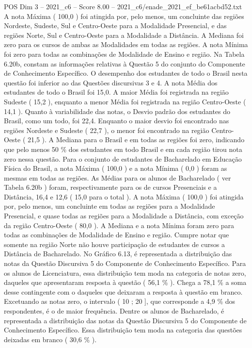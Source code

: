 \begin{textsample}{POS Dim 3 – 2021\_c6 – Score 8.00 – 2021\_c6/enade\_2021\_ef\_be61acbd52.txt}
A nota Máxima ( 100,0 ) foi atingida por, pelo menos, um concluinte das regiões Nordeste, Sudeste, Sul e Centro-Oeste para a Modalidade Presencial, e das regiões Norte, Sul e Centro-Oeste para a Modalidade a Distância.
A Mediana foi zero para os cursos de ambas as Modalidades em todas as regiões.
A nota Mínima foi zero para todas as combinações de Modalidade de Ensino e região.
Na Tabela 6.20b, constam as informações relativas à Questão 5 do conjunto do Componente de Conhecimento Específico.
O desempenho dos estudantes de todo o Brasil nesta questão foi inferior ao das Questões discursivas 3 e 4.
A nota Média dos estudantes de todo o Brasil foi 15,0.
A maior Média foi registrada na região Sudeste ( 15,2 ), enquanto a menor Média foi registrada na região Centro-Oeste ( 14,1 ).
Quanto à variabilidade das notas, o Desvio padrão dos estudantes do Brasil, como um todo, foi 22,4.
Enquanto o maior desvio foi encontrado nas regiões Nordeste e Sudeste ( 22,7 ), o menor foi encontrado na região Centro-Oeste ( 21,5 ).
A Mediana para o Brasil e em todas as regiões foi zero, indicando que pelo menos 50 \% dos estudantes em todo Brasil e em cada região tirou nota zero nessa questão.
Para o conjunto de estudantes de Bacharelado em Educação Física do Brasil, a nota Máxima ( 100,0 ) e a nota Mínima ( 0,0 ) foram as mesmas em todas as regiões.
As Médias para os alunos de Bacharelado ( ver Tabela 6.20b ) foram, respectivamente para os de cursos Presenciais e a Distância, 16,4 e 12,6 ( 15,0 para o total ).
A nota Máxima ( 100,0 ) foi atingida por, pelo menos, um concluinte em todas as regiões para a Modalidade Presencial, e quase todas as regiões para a Modalidade a Distância, com exceção da região Centro-Oeste ( 80,0 ).
A Mediana e a nota Mínima foram zero para todas as combinações de Modalidade de Ensino e região.
Cumpre notar que somente na região Norte não houve participação de estudantes de cursos a Distância de Bacharelado.
No Gráfico 6.13, é representada a distribuição das notas da Questão Discursiva 5 do Componente de Conhecimento Específico.
Para os alunos de Licenciatura, essa distribuição tem moda na categoria de notas zero, daqueles que apresentaram resposta à questão ( 56,1 \% ).
Chega a 78,1 \% a soma desse contingente com o daqueles que deixaram a resposta à questão em branco.
Excetuando as notas zero, o intervalo ( 10 ; 20 ], que corresponde a 4,9 \% dos respondentes, é o de maior frequência.
Dentre os alunos de Bacharelado, é representada a distribuição das notas da Questão Discursiva 5 do Componente de Conhecimento Específico.
Essa distribuição tem moda na categoria das questões deixadas em branco ( 30,6 \% ).

\end{textsample}
